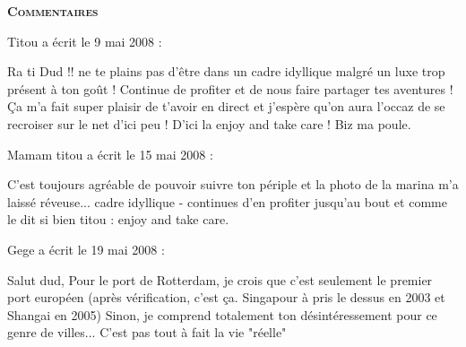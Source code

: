 \bigskip
\textbf{\textsc{Commentaires}}

\medskip
Titou a écrit le 9 mai 2008 :
\begin{displayquote}
Ra ti Dud !! ne te plains pas d'être dans un cadre idyllique malgré un luxe trop présent à ton goût ! Continue de profiter et de nous faire partager tes aventures ! Ça m'a fait super plaisir de t'avoir en direct et j'espère qu'on aura l'occaz de se recroiser sur le net d'ici peu ! D'ici la enjoy and take care !
Biz ma poule.
\end{displayquote}

\medskip
Mamam titou a écrit le 15 mai 2008 :
\begin{displayquote}
C'est toujours agréable de pouvoir suivre ton périple et la photo de la marina m'a laissé réveuse... cadre idyllique - continues d'en profiter jusqu'au bout et comme le dit si bien titou : enjoy and take care.
\end{displayquote}

\medskip
Gege a écrit le 19 mai 2008 :
\begin{displayquote}
Salut dud,
Pour le port de Rotterdam, je crois que c'est seulement le premier port européen (après vérification, c'est ça. Singapour à pris le dessus en 2003 et Shangai en 2005)
Sinon, je comprend totalement ton désintéressement pour ce genre de villes...
C'est pas tout à fait la vie "réelle"
\end{displayquote}

\vfill

